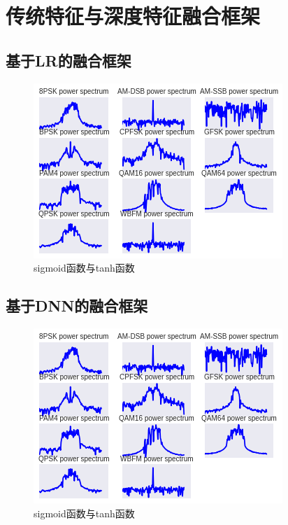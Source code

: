 \section{传统特征与深度特征融合框架}

\subsection{基于LR的融合框架}
\begin{figure}[!h]
	\centering
	\includegraphics[scale=0.9]{figures/chapter_3/signal_view_2}
	\caption{sigmoid函数与tanh函数}\label{fig_2_2}
\end{figure}

\subsection{基于DNN的融合框架}
\begin{figure}[!h]
	\centering
	\includegraphics[scale=0.9]{figures/chapter_3/signal_view_2}
	\caption{sigmoid函数与tanh函数}\label{fig_2_2}
\end{figure}

